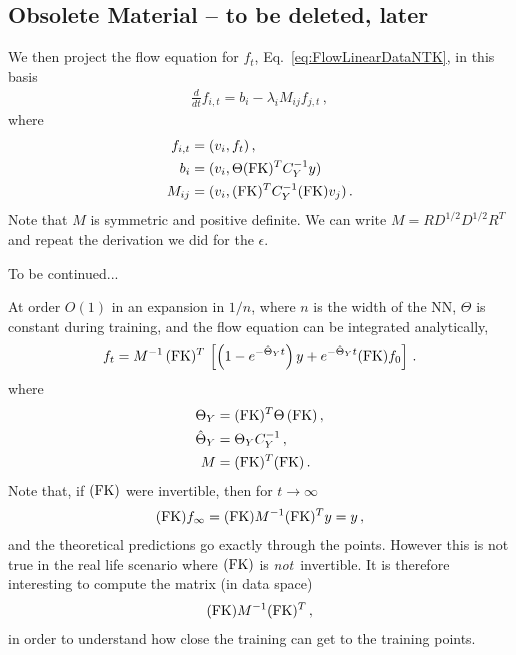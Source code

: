 \documentclass[11pt]{article}
\begin{document}
\subsection*{Obsolete Material -- to be deleted, later}

We then project the flow equation for $f_t$, Eq.~\ref{eq:FlowLinearDataNTK}, in this basis
\begin{align}
    \label{eq:FlowEigenbasisNTK}
    \frac{d}{dt} f_{i,t} = b_i - \lambda_i M_{ij} f_{j,t}\, ,
\end{align} 
where
\begin{align}
    f_{i,t} &= (v_i, f_t)\, , \\
    b_i &= (v_i, \Theta (\mathrm{FK})^T C_Y^{-1} y)\, \\
    M_{ij} &= (v_i, (\mathrm{FK})^T C_Y^{-1} (\mathrm{FK}) v_j)\, .
\end{align}
Note that $M$ is symmetric and positive definite. We can write $M = R D^{1/2} D^{1/2} R^T$ and repeat the 
derivation we did for the $\epsilon$.

To be continued... 

At order $O(1)$ in an expansion in $1/n$, where $n$ is the width of the NN, $\Theta$ is constant during training, and the flow equation can be integrated analytically, 
\begin{align}
    \label{eq:IntegrateFlowAtLeadingOrder}
    f_t = M^{-1}\, (\mathrm{FK})^T\, \left[
        \left(1 - e^{-\hat{\Theta}_Yt}\right) y +
        e^{-\hat{\Theta}_Y t} (\mathrm{FK}) f_0
    \right]\, .
\end{align}
where 
\begin{align}
    \label{eq:DefineThetaM}
    \Theta_Y &= (\mathrm{FK})^T \Theta\, (\mathrm{FK})\, , \\
    \hat{\Theta}_Y &= \Theta_Y C_Y^{-1}\, , \\    
    M &=  (\mathrm{FK})^T (\mathrm{FK})\, .
\end{align}
Note that, if $(\mathrm{FK})$ were invertible, then for $t\to\infty$
\begin{align}
    (\mathrm{FK}) f_\infty = (\mathrm{FK}) M^{-1} (\mathrm{FK})^T y = y\, ,
\end{align}
and the theoretical predictions go exactly through the points. However this is not true in the real life scenario where $(\mathrm{FK})$ is {\em not}\ invertible. It is therefore interesting to compute the matrix (in data space)
\begin{align}
    (\mathrm{FK}) M^{-1} (\mathrm{FK})^T \, ,    
\end{align}
in order to understand how close the training can get to the training points. 
\end{document}
